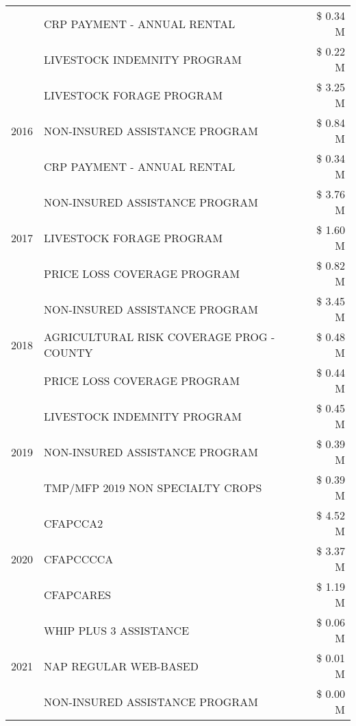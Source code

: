 \begin{tabular}{llr}
 & CRP PAYMENT - ANNUAL RENTAL & \$ 0.34 M \\
 & LIVESTOCK INDEMNITY PROGRAM & \$ 0.22 M \\
\cline{1-3}
\multirow[t]{3}{*}{2016} & LIVESTOCK FORAGE PROGRAM & \$ 3.25 M \\
 & NON-INSURED ASSISTANCE PROGRAM & \$ 0.84 M \\
 & CRP PAYMENT - ANNUAL RENTAL & \$ 0.34 M \\
\cline{1-3}
\multirow[t]{3}{*}{2017} & NON-INSURED ASSISTANCE PROGRAM & \$ 3.76 M \\
 & LIVESTOCK FORAGE PROGRAM & \$ 1.60 M \\
 & PRICE LOSS COVERAGE PROGRAM & \$ 0.82 M \\
\cline{1-3}
\multirow[t]{3}{*}{2018} & NON-INSURED ASSISTANCE PROGRAM & \$ 3.45 M \\
 & AGRICULTURAL RISK COVERAGE PROG - COUNTY & \$ 0.48 M \\
 & PRICE LOSS COVERAGE PROGRAM & \$ 0.44 M \\
\cline{1-3}
\multirow[t]{3}{*}{2019} & LIVESTOCK INDEMNITY PROGRAM & \$ 0.45 M \\
 & NON-INSURED ASSISTANCE PROGRAM & \$ 0.39 M \\
 & TMP/MFP 2019 NON SPECIALTY CROPS & \$ 0.39 M \\
\cline{1-3}
\multirow[t]{3}{*}{2020} & CFAPCCA2 & \$ 4.52 M \\
 & CFAPCCCCA & \$ 3.37 M \\
 & CFAPCARES & \$ 1.19 M \\
\cline{1-3}
\multirow[t]{3}{*}{2021} & WHIP PLUS 3 ASSISTANCE & \$ 0.06 M \\
 & NAP REGULAR WEB-BASED & \$ 0.01 M \\
 & NON-INSURED ASSISTANCE PROGRAM & \$ 0.00 M \\
\cline{1-3}
\bottomrule
\end{tabular}
